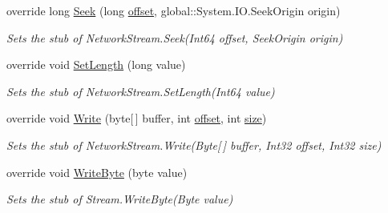 \begin{DoxyCompactItemize}
override long \hyperlink{class_system_1_1_net_1_1_sockets_1_1_fakes_1_1_stub_network_stream_abfab782989aaa7df36123c25e7bd9d20}{Seek} (long \hyperlink{jquery-1_810_82_8js_a4a9f594d20d927164551fc7fa4751a2f}{offset}, global\-::\-System.\-I\-O.\-Seek\-Origin origin)
\begin{DoxyCompactList}\small\item\em Sets the stub of Network\-Stream.\-Seek(\-Int64 offset, Seek\-Origin origin)\end{DoxyCompactList}\item 
override void \hyperlink{class_system_1_1_net_1_1_sockets_1_1_fakes_1_1_stub_network_stream_aad28a3d8b6df927de4fa6f6d37171bf2}{Set\-Length} (long value)
\begin{DoxyCompactList}\small\item\em Sets the stub of Network\-Stream.\-Set\-Length(\-Int64 value)\end{DoxyCompactList}\item 
override void \hyperlink{class_system_1_1_net_1_1_sockets_1_1_fakes_1_1_stub_network_stream_a5fb73aea62f661008c607c81b3b26332}{Write} (byte\mbox{[}$\,$\mbox{]} buffer, int \hyperlink{jquery-1_810_82_8js_a4a9f594d20d927164551fc7fa4751a2f}{offset}, int \hyperlink{jquery-1_810_82_8js_afa6806c6ee5e63d5177f1dcc082ba6bc}{size})
\begin{DoxyCompactList}\small\item\em Sets the stub of Network\-Stream.\-Write(\-Byte\mbox{[}$\,$\mbox{]} buffer, Int32 offset, Int32 size)\end{DoxyCompactList}\item 
override void \hyperlink{class_system_1_1_net_1_1_sockets_1_1_fakes_1_1_stub_network_stream_afc3e1c93fbb520a728deb650977ddd3c}{Write\-Byte} (byte value)
\begin{DoxyCompactList}\small\item\em Sets the stub of Stream.\-Write\-Byte(\-Byte value)\end{DoxyCompactList}\end{DoxyCompactItemize}
